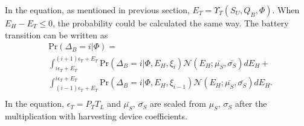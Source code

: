 \documentclass[conference]{IEEEtran}
\begin{document}
In the equation, as mentioned in previous section, \(E_T = \Upsilon_T(S_U, Q_B, \Phi)\).
When \(E_H - E_T \le 0\), the probability could be calculated the same way.
The battery transition can be written as
\begin{equation}\label{battery}
\begin{aligned}
	&\mbox{Pr}\left(\Delta_B = i |\Phi\right) = \\
	&\int\nolimits_{i\epsilon_T + E_T}^{\left(i+1\right)\epsilon_T+ E_T}
	\mbox{Pr}\left(\Delta_B = i |\Phi, E_H, \xi_i\right) \mathcal{N}\left(E_H;\bar{\mu_S},\bar{\sigma_S}\right) dE_H+\\
	& \int_{\left(i-1\right)\epsilon_T+ E_T}^{i\epsilon_T + E_T}
	\mbox{Pr}\left(\Delta_B = i |\Phi, E_H, \xi_{i-1}\right) \mathcal{N}\left(E_H;\bar{\mu_S},\bar{\sigma_S}\right) dE_H.\\
\end{aligned}
\end{equation}
In the equation, \(\epsilon_T = P_TT_L\) and \(\bar{\mu_S},\,\bar{\sigma_S}\)
are scaled from \(\mu_S,\,\sigma_S\) after the multiplication with harvesting device coefficients.
\end{document}
